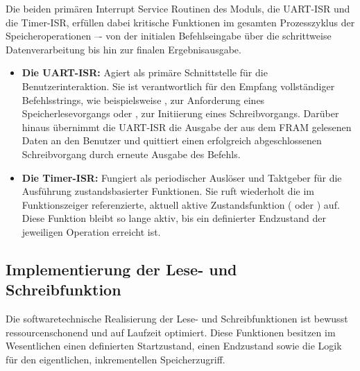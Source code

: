 Die beiden prim\"aren Interrupt Service Routinen des Moduls, die UART-ISR und die Timer-ISR, erf\"ullen dabei kritische Funktionen im gesamten Prozesszyklus der Speicheroperationen –- von der initialen Befehlseingabe \"uber die schrittweise Datenverarbeitung bis hin zur finalen Ergebnisausgabe.

\begin{itemize}
	\item \textbf{Die UART-ISR:} Agiert als prim\"are Schnittstelle f\"ur die Benutzerinteraktion. Sie ist verantwortlich f\"ur den Empfang vollst\"andiger Befehlsstrings, wie beispielsweise \grqq{}\grqq, zur Anforderung eines Speicherlesevorgangs oder \grqq{}\grqq, zur Initiierung eines Schreibvorgangs. Dar\"uber hinaus \"ubernimmt die UART-ISR die Ausgabe der aus dem FRAM gelesenen Daten an den Benutzer und quittiert einen erfolgreich abgeschlossenen Schreibvorgang durch erneute Ausgabe des Befehls.
	
	\item \textbf{Die Timer-ISR:} Fungiert als periodischer Ausl\"oser und Taktgeber f\"ur die Ausf\"uhrung zustandsbasierter Funktionen. Sie ruft wiederholt die im Funktionszeiger  referenzierte, aktuell aktive Zustandsfunktion (\zB {} oder ) auf. Diese Funktion bleibt so lange aktiv, bis ein definierter Endzustand der jeweiligen Operation erreicht ist.
\end{itemize}


\newpage
\subsection{Implementierung der Lese- und Schreibfunktion}
\label{Implementierung_Lesen_Schreiben}

Die softwaretechnische Realisierung der Lese- und Schreibfunktionen ist bewusst ressourcenschonend und auf Laufzeit optimiert. Diese Funktionen besitzen im Wesentlichen einen definierten Startzustand, einen Endzustand sowie die Logik f\"ur den eigentlichen, inkrementellen Speicherzugriff.

